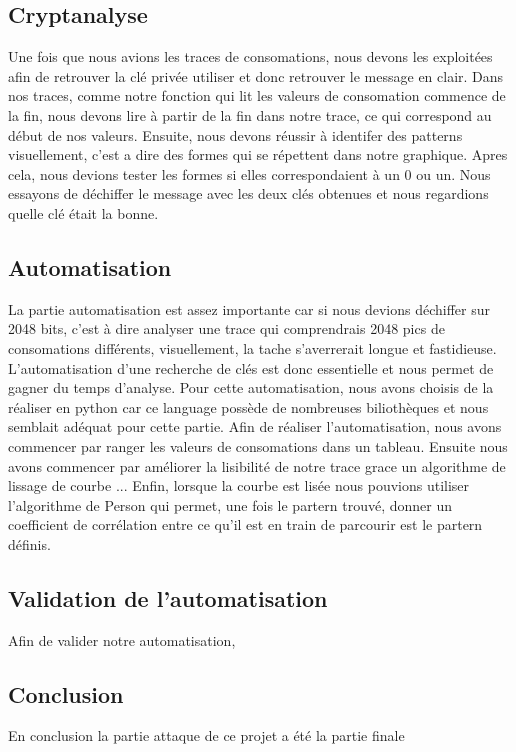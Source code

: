 \subsection{Cryptanalyse}
Une fois que nous avions les traces de consomations, nous devons les exploitées afin de retrouver la clé privée utiliser et donc retrouver le message en clair. 
Dans nos traces, comme notre fonction qui lit les valeurs de consomation commence de la fin, nous devons lire à partir de la fin dans notre trace, ce qui correspond au début de nos valeurs. 
Ensuite, nous devons réussir à identifer des patterns visuellement, c'est a dire des formes qui se répettent dans notre graphique. 
Apres cela, nous devions tester les formes si elles correspondaient à un 0 ou un. Nous essayons de déchiffer le message avec les deux clés obtenues et nous regardions quelle clé était la bonne.
\subsection{Automatisation}
La partie automatisation est assez importante car si nous devions déchiffer sur 2048 bits, c'est à dire analyser une trace qui comprendrais 2048 pics de consomations différents, visuellement, la tache s'averrerait longue et fastidieuse. L'automatisation d'une recherche de clés est donc essentielle et nous permet de gagner du temps d'analyse.
Pour cette automatisation, nous avons choisis de la réaliser en python car ce language possède de nombreuses biliothèques et nous semblait adéquat pour cette partie.
Afin de réaliser l'automatisation, nous avons commencer par ranger les valeurs de consomations dans un tableau. 
Ensuite nous avons commencer par améliorer la lisibilité de notre trace grace un algorithme de lissage de courbe ...
Enfin, lorsque la courbe est lisée nous pouvions utiliser l'algorithme de Person qui permet, une fois le partern trouvé, donner un coefficient de corrélation entre ce qu'il est en train de parcourir est le partern définis.

\subsection{Validation de l'automatisation}
Afin de valider notre automatisation, 
\subsection{Conclusion}
En conclusion la partie attaque de ce projet a été la partie finale 
